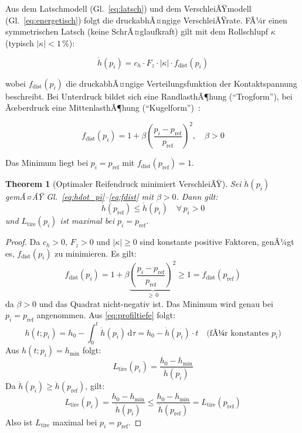 ﻿\documentclass[12pt,a4paper]{article}
\newtheorem{theorem}{Theorem}[section]
\theoremstyle{definition}
\theoremstyle{remark}
\newcommand{\Ltire}{L_{\mathrm{tire}}}
\newcommand{\pref}{p_{\mathrm{ref}}}
\newcommand{\Fz}{F_z}
\begin{document}
Aus dem Latschmodell (Gl.~\ref{eq:latsch}) und dem VerschleiÃŸmodell
(Gl.~\ref{eq:energetisch}) folgt die druckabhÃ¤ngige VerschleiÃŸrate.
FÃ¼r einen symmetrischen Latsch (keine SchrÃ¤glaufkraft) gilt mit dem
Rollschlupf $\kappa$ (typisch $|\kappa| < 1$\,\%):

\begin{equation}
  \dot{h}(p_i) = c_h \cdot \Fz \cdot |\kappa| \cdot f_{\mathrm{dist}}(p_i)
  \label{eq:hdot_pi}
\end{equation}

wobei $f_{\mathrm{dist}}(p_i)$ die druckabhÃ¤ngige Verteilungsfunktion der
Kontaktspannung beschreibt. Bei Unterdruck bildet sich eine RandlasthÃ¶hung
(``Trogform''), bei Ãœberdruck eine MittenlasthÃ¶hung (``Kugelform'')~\cite{Gent2006}:

\begin{equation}
  f_{\mathrm{dist}}(p_i) = 1 + \beta \left(\frac{p_i - \pref}{\pref}\right)^2,
  \quad \beta > 0
  \label{eq:fdist}
\end{equation}

Das Minimum liegt bei $p_i = \pref$ mit $f_{\mathrm{dist}}(\pref) = 1$.

\begin{theorem}[Optimaler Reifendruck minimiert VerschleiÃŸ]
\label{thm:pressure}
Sei $\dot{h}(p_i)$ gemÃ¤ÃŸ Gl.~\eqref{eq:hdot_pi}--\eqref{eq:fdist} mit
$\beta > 0$. Dann gilt:
\begin{equation}
  \dot{h}(\pref) \leq \dot{h}(p_i) \quad \forall\, p_i > 0
  \label{eq:thm_pressure}
\end{equation}
und $\Ltire(p_i)$ ist maximal bei $p_i = \pref$.
\end{theorem}

\begin{proof}
Da $c_h > 0$, $\Fz > 0$ und $|\kappa| \geq 0$ sind konstante positive Faktoren,
genÃ¼gt es, $f_{\mathrm{dist}}(p_i)$ zu minimieren.
Es gilt:
\begin{equation}
  f_{\mathrm{dist}}(p_i) = 1 + \beta \underbrace{\left(\frac{p_i - \pref}{\pref}\right)^2}_{\geq\, 0}
  \geq 1 = f_{\mathrm{dist}}(\pref)
\end{equation}
da $\beta > 0$ und das Quadrat nicht-negativ ist. Das Minimum wird genau bei
$p_i = \pref$ angenommen. Aus \eqref{eq:profiltiefe} folgt:
\begin{equation}
  h(t; p_i) = h_0 - \int_0^t \dot{h}(p_i)\,\mathrm{d}\tau
            = h_0 - \dot{h}(p_i) \cdot t
  \quad\text{(fÃ¼r konstantes $p_i$)}
\end{equation}
Aus $h(t; p_i) = h_{\min}$ folgt:
\begin{equation}
  \Ltire(p_i) = \frac{h_0 - h_{\min}}{\dot{h}(p_i)}
\end{equation}
Da $\dot{h}(p_i) \geq \dot{h}(\pref)$, gilt:
\begin{equation}
  \Ltire(p_i) = \frac{h_0 - h_{\min}}{\dot{h}(p_i)}
              \leq \frac{h_0 - h_{\min}}{\dot{h}(\pref)} = \Ltire(\pref)
\end{equation}
Also ist $\Ltire$ maximal bei $p_i = \pref$.
\end{proof}
\end{document}
